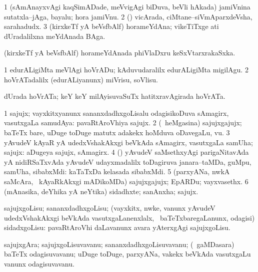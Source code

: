 \bentry
{}
\gl{\nA}
\bmng
\bnum
\num{1} (sAmAnayxvAgi kaqSimADade, meVvigAgi biDuva, beVli hAkada) jamiVnina sutatxla--jAga, bayalu; hora jamiVnu. 
\num{2} (\rUpa) vicArada, ciMtane--siVmAparxdeVsha, sarahadudx. 
\num{3} (kirxkeTf yA beVsfbAlf) horameYdAna; vikeTiTxge ati dUradalilxna meYdAnada BAga. 
\enum
\emng
\eentry

\bentry
{}
\gl{\nA}
\bmng
(kirxkeTf yA beVsfbAlf) horameYdAnada phiVlaDxru keSxVtarxrakaSxka. 
\emng
\eentry

\bentry
{}
\gl{\sakirx}
\bmng
\bnum
\num{1} edurALigiMta meVlAgi hoVrADu; kAduvudaralilx edurALigiMta migilAgu. 
\num{2} hoVrATadalilx (edurALiyanunx) miVrisu, soVlisu. 
\enum
\emng
\eentry

\bentry
{}
\gl{\nA}
\bmng
dUrada hoVrATa; keY keY milAyisuvaSuTx hatitxravAgirada hoVrATa. 
\emng
\eentry

\bentry
{}
\gl{\nA}
\bmng
\bnum
\num{1} sajujx; vayxkitxyanunx sananxdadhxgoLisalu odagisikoDuva sAmagirx, vasutxgaLa samudAya:  pavaRtAroVhiya sajujx. 
\num{2} (\kanmu\ heMgasina) sajujxgajujx; baTeTx bare, uDuge toDuge matutx adakekx hoMduva oDavegaLu, \mo vu. 
\num{3} yAvudeV kAyaR yA udedxVshakAkxgi beVkAda sAmagirx, vasutxgaLa samUha; sajujx:  aDugeya sajujx, sAmagirx. 
\num{4} (\AmA) yAvudeV saMsethxyAgi parigaNitavAda yA nidiRSaTxvAda yAvudeV udayxmadalilx toDagiruva janara--taMDa, guMpu, samUha, sibabxMdi:  kaTaTxDa kelasada sibabxMdi. 
\num{5} (parxyANa, nwkA saMcAra, \mo\ kAyaRkAkxgi mADikoMDa) sajujxgajujx; EpARDu; vayxvasethx. 
\num{6} (mAnasika, deYhika yA neYtika) sidadhxte; sanAnxha; sajujx. 
\enum
\emng
\eentry

\bentry
{}
\gl{\sakirx}
\bmng
sajujxgoLisu; sananxdadhxgoLisu; (vayxkitx, nwke, \mo vanunx yAvudeV udedxVshakAkxgi beVkAda vasutxgaLanenxlalx, \kanmu\ baTeTxbaregaLanunx, odagisi) sidadxgoLisu:  pavaRtAroVhi daLavanunx avara yAterxgAgi sajujxgoLisu. 
\emng
\eentry

\bentry
{}
\gl{\nA}
\bmng
sajujxgAra; sajujxgoLisuvavanu; sananxdadhxgoLisuvavanu; (\kanmu\ gaMDasara) baTeTx odagisuvavanu; uDuge toDuge, parxyANa, \mo vakekx beVkAda vasutxgaLu \mo vanunx odagisuvavanu. 
\emng
\eentry

